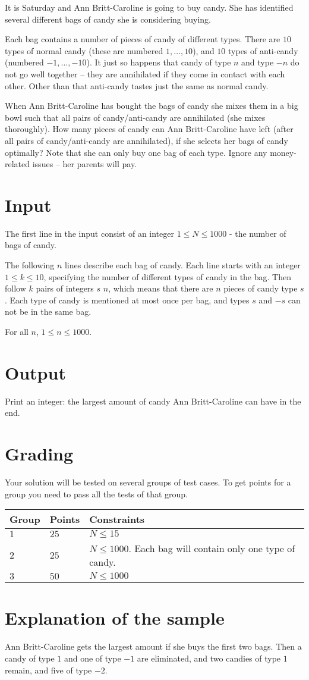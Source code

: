 It is Saturday and Ann Britt-Caroline is going to buy candy. She has identified several different bags of candy she is considering buying.

Each bag contains a number of pieces of candy of different types. There are $10$ types of normal candy (these are numbered $1, \ldots, 10$), and $10$ types of anti-candy (numbered $-1, \ldots, -10$). It just so happens that candy of type $n$ and type $-n$ do not go well together -- they are annihilated if they come in contact with each other. Other than that anti-candy tastes just the same as normal candy.

When Ann Britt-Caroline has bought the bags of candy she mixes them in a big bowl such that all pairs of candy/anti-candy are annihilated (she mixes thoroughly). How many pieces of candy can Ann Britt-Caroline have left (after all pairs of candy/anti-candy are annihilated), if she selects her bags of candy optimally? Note that she can only buy one bag of each type. Ignore any money-related issues -- her parents will pay.
\section*{Input}
The first line in the input consist of an integer $1 \le N \le 1000$ - the number of bags of candy.

The following $n$ lines describe each bag of candy.
Each line starts with an integer $1 \le k \le 10$, specifying the number of different types of candy in the bag.
Then follow $k$ pairs of integers $s$ $n$, which means that there are $n$ pieces of candy type $s$.
Each type of candy is mentioned at most once per bag, and types $s$ and $-s$ can not be in the same bag.

For all $n$, $1 \le n \le 1000$.

\section*{Output}
Print an integer: the largest amount of candy Ann Britt-Caroline can have in the end.

\section*{Grading}
Your solution will be tested on several groups of test cases. To get points for a group you need to pass all the tests of that group.

\noindent
\begin{tabular}{| l | l | l |}
	\hline
	Group & Points & Constraints\\ \hline
 $1$    & $25$        & $N \le 15$ \\ \hline
 $2$    & $25$        & $N \le 1000$. Each bag will contain only one type of candy. \\ \hline
 $3$    & $50$        & $N \le 1000$ \\ \hline
\end{tabular}

\section*{Explanation of the sample}
Ann Britt-Caroline gets the largest amount if she buys the first two bags. Then a candy of type $1$ and one of type $-1$ are eliminated, and two candies of type $1$ remain, and five of type $-2$.
